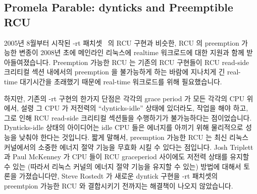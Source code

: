 
\subsection{Promela Parable: dynticks and Preemptible RCU}
\label{sec:formal:Promela Parable: dynticks and Preemptible RCU}

2005년 8월부터 시작된 -rt 패치셋~\cite{IngoMolnar05a} 의 RCU 구현과 비슷한, RCU
의 preemption 가능한 변종이 2008년 초에 메인라인 리눅스에 realtime 워크로드에
대한 지원과 함께 받아들여졌습니다.
Preemption 가능한 RCU 는 기존의 RCU 구현들이 RCU read-side 크리티컬 섹션
내에서의 preemption 을 불가능하게 하는 바람에 지나치게 긴 real-time 대기시간을
초래했기 때문에 real-time 워크로드를 위해 필요했습니다.
\iffalse

In early 2008, a preemptible variant of RCU was accepted into
mainline Linux in support of real-time workloads,
a variant similar to the RCU implementations in
the -rt patchset~\cite{IngoMolnar05a}
since August 2005.
Preemptible RCU is needed for real-time workloads because older
RCU implementations disable preemption across RCU read-side
critical sections, resulting in excessive real-time latencies.
\fi

하지만, 기존의 -rt 구현의 한가지 단점은 각각의 grace period 가 모든 각각의 CPU
위에서, 설령 그 CPU 가 저전력의 ``dynticks-idle'' 상태에 있더라도, 작업을 해야
하고, 그로 인해 RCU read-side 크리티컬 섹션들을 수행하기가 불가능하다는
점이었습니다.
Dynticks-idle 상태의 아이디어는 idle CPU 들은 에너지를 아끼기 위해 물리적으로
성능을 낮춰야 한다는 것입니다.
짧게 말해서, preemption 가능한 RCU 는 최신 리눅스 커널에서의 소중한 에너지 절약
기능을 무효화 시킬 수 있다는 점입니다.
Josh Triplett 과 Paul McKenney 가 CPU 들이 RCU graceperiod 사이에도 저전력
상태를 유지할 수 있는 (따라서 리눅스 커널의 에너지 절약 기능을 유지할 수 있는)
방법에 대해서 토론을 가졌습니다만, Steve Rostedt 가 새로운 dyntick 구현을 -rt
패치셋의 preemtpion 가능한 RCU 와 결합시키기 전까지는 해결책이 나오지
않았습니다.
\iffalse

However, one disadvantage of the older -rt implementation
was that each grace period
requires work to be done on each CPU, even if that CPU is in a low-power
``dynticks-idle'' state,
and thus incapable of executing RCU read-side critical sections.
The idea behind the dynticks-idle state is that idle CPUs
should be physically powered down in order to conserve energy.
In short, preemptible RCU can disable a valuable energy-conservation
feature of recent Linux kernels.
Although Josh Triplett and Paul McKenney
had discussed some approaches for allowing
CPUs to remain in low-power state throughout an RCU grace period
(thus preserving the Linux kernel's ability to conserve energy), matters
did not come to a head until Steve Rostedt integrated a new dyntick
implementation with preemptible RCU in the -rt patchset.
\fi

